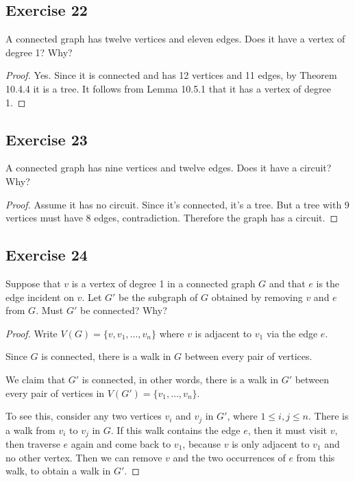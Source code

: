 \documentclass[14pt]{extarticle}
\begin{document}
\subsection{Exercise 22}
A connected graph has twelve vertices and eleven edges. Does it have a vertex of degree 1? Why?

\begin{proof}
    Yes. Since it is connected and has 12 vertices and 11 edges, by Theorem 10.4.4 it is a tree. It follows from Lemma 10.5.1
    that it has a vertex of degree 1.
\end{proof}

\subsection{Exercise 23}
A connected graph has nine vertices and twelve edges. Does it have a circuit? Why?

\begin{proof}
    Assume it has no circuit. Since it's connected, it's a tree. But a tree with 9 vertices must have 8 edges, contradiction.
    Therefore the graph has a circuit.
\end{proof}

\subsection{Exercise 24}
Suppose that \(v\) is a vertex of degree 1 in a connected graph \(G\) and that \(e\) is the edge incident on \(v\). Let
\(G'\) be the subgraph of \(G\) obtained by removing \(v\) and \(e\) from \(G\). Must \(G'\) be connected? Why?

\begin{proof}
    Write \(V(G) = \{v, v_1, \ldots, v_n\}\) where \(v\) is adjacent to \(v_1\) via the edge \(e\).

    Since \(G\) is connected, there is a walk in \(G\) between every pair of vertices.

    We claim that \(G'\) is connected, in other words, there is a walk in \(G'\) between every pair of vertices in \(V(G') =
    \{v_1, \ldots, v_n\}\).

    To see this, consider any two vertices \(v_i\) and \(v_j\) in \(G'\), where \(1 \leq i, j \leq n\). There is a walk from \(v_i\) to \(v_j\) in \(G\). If this walk contains the edge \(e\), then it must visit \(v\), then traverse \(e\) again and
    come back to \(v_1\), because \(v\) is only adjacent to \(v_1\) and no other vertex. Then we can remove \(v\) and the
    two occurrences of \(e\) from this walk, to obtain a walk in \(G'\).
\end{proof}
\end{document}
